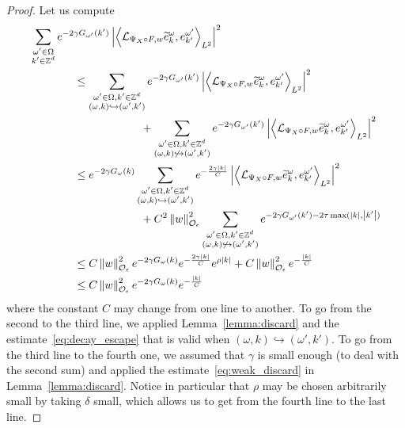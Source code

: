 \documentclass[10pt]{amsart}
\theoremstyle{definition}\newtheorem{defi}[theo]{Definition}\newtheorem{rema}[theo]{Remark}\newtheorem{exam}[theo]{Example}\newtheorem{exem}[theo]{Example}\newtheorem{nota}[theo]{Notation}
\newcommand{\n}[1]{\left\|#1\right\|}
\newcommand{\va}[1]{\left|#1\right|}
\newcommand{\clO}{\mathcal{O}}
\newcommand{\clL}{\mathcal{L}}
\newcommand{\bbZ}{\mathbb{Z}}
\let\oldtilde\tilde
\renewcommand*{\tilde}[1]{\mathchoice{\widetilde{#1}}{\widetilde{#1}}{\oldtilde{#1}}{\oldtilde{#1}}}
\begin{document}
\begin{proof}
Let us compute
\begingroup
\allowdisplaybreaks
\begin{align*}
& \sum_{\substack{\omega' \in \Omega \\ k' \in \bbZ^d}} e^{-2 \gamma G_{\omega'}(k')} \va{\left\langle \clL_{\Psi_X \circ F,w} \tilde{e}_{k}^{\omega}, e_{k'}^{\omega'}\right\rangle_{L^2}}^2 \\ & \qquad \qquad \leq \sum_{\substack{\omega' \in \Omega, k' \in \bbZ^d \\ (\omega,k) \hookrightarrow (\omega',k')}} e^{-2 \gamma G_{\omega'}(k')} \va{\left\langle \clL_{\Psi_X \circ F,w} \tilde{e}_{k}^{\omega}, e_{k'}^{\omega'}\right\rangle_{L^2}}^2 \\
& \qquad \qquad \qquad \qquad \qquad + \sum_{\substack{\omega' \in \Omega, k' \in \bbZ^d \\ (\omega,k) \not\hookrightarrow (\omega',k')}} e^{-2 \gamma G_{\omega'}(k')} \va{\left\langle \clL_{\Psi_X \circ F,w} \tilde{e}_{k}^{\omega}, e_{k'}^{\omega'}\right\rangle_{L^2}}^2 \\
& \qquad \qquad \leq e^{-2 \gamma G_\omega(k)} \sum_{\substack{\omega' \in \Omega, k' \in \bbZ^d \\ (\omega,k) \hookrightarrow (\omega',k')}} e^{- \frac{2 \gamma \va{k}}{C}} \va{\left\langle \clL_{\Psi_X \circ F,w} \tilde{e}_{k}^{\omega}, e_{k'}^{\omega'}\right\rangle_{L^2}}^2 \\
& \qquad \qquad \qquad \qquad \qquad + C^2 \n{w}_{\clO_\epsilon}^2 \sum_{\substack{\omega' \in \Omega, k' \in \bbZ^d \\ (\omega,k) \not\hookrightarrow (\omega',k')}} e^{-2 \gamma G_{\omega'}(k') - 2 \tau \max(\va{k},\va{k'}) } \\
& \qquad \qquad \leq C \n{w}_{\clO_\epsilon}^2 e^{-2 \gamma G_\omega(k)}e^{- \frac{2 \gamma \va{k}}{C}} e^{\rho \va{k}} + C \n{w}_{\clO_\epsilon}^2 e^{- \frac{\va{k}}{C}} \\
& \qquad \qquad \leq C \n{w}_{\clO_\epsilon}^2 e^{-2 \gamma G_\omega(k)} e^{ - \frac{\va{k}}{C}}
\end{align*}
\endgroup
\noindent where the constant $C$ may change from one line to another. To go from the second to the third line, we applied Lemma~\ref{lemma:discard} and the estimate~\eqref{eq:decay_escape} that is valid when $(\omega,k) \hookrightarrow (\omega',k')$. To go from the third line to the fourth one, we assumed that $\gamma$ is small enough (to deal with the second sum) and applied the estimate~\eqref{eq:weak_discard} in Lemma~\ref{lemma:discard}. Notice in particular that $\rho$ may be chosen arbitrarily small by taking $\delta$ small, which allows us to get from the fourth line to the last line.


\end{proof}
\end{document}
